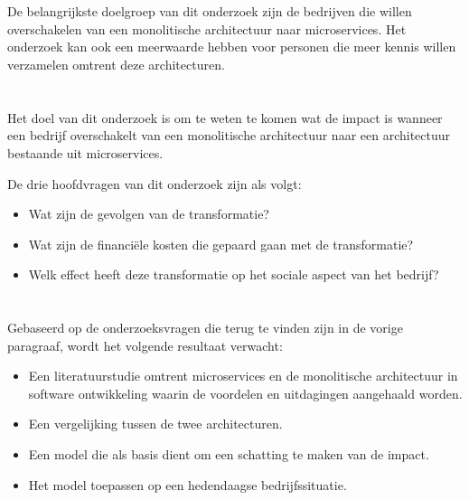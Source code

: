 \section{}
\label{sec:probleemstelling}

De belangrijkste doelgroep van dit onderzoek zijn de bedrijven die willen overschakelen van een monolitische architectuur naar microservices. Het onderzoek kan ook een meerwaarde hebben voor personen die meer kennis willen verzamelen omtrent deze architecturen. 

\section{}
\label{sec:onderzoeksvraag}

Het doel van dit onderzoek is om te weten te komen wat de impact is wanneer een bedrijf overschakelt van een monolitische architectuur naar een architectuur bestaande uit microservices.

De drie hoofdvragen van dit onderzoek zijn als volgt:
\begin{itemize}
    \item Wat zijn de gevolgen van de transformatie?
    \item Wat zijn de financiële kosten die gepaard gaan met de transformatie?
    \item Welk effect heeft deze transformatie op het sociale aspect van het bedrijf?
\end{itemize}

\section{}
\label{sec:onderzoeksdoelstelling}

Gebaseerd op de onderzoeksvragen die terug te vinden zijn in de vorige paragraaf, wordt het volgende resultaat verwacht:

\begin{itemize}
    \item Een literatuurstudie omtrent microservices en de monolitische architectuur in software ontwikkeling waarin de voordelen en uitdagingen aangehaald worden.
    \item Een vergelijking tussen de twee architecturen. 
    \item Een model die als basis dient om een schatting te maken van de impact.
    \item Het model toepassen op een hedendaagse bedrijfssituatie.
\end{itemize}
\newpage

